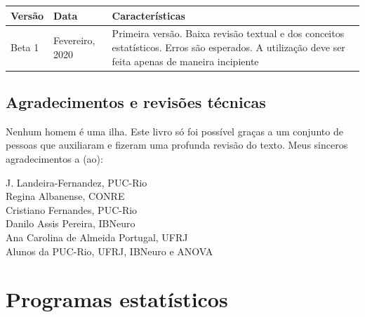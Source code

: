 \documentclass[
]{book}
\begin{document}
\begin{longtable}[]{@{}lll@{}}
\toprule
\begin{minipage}[b]{0.24\columnwidth}\raggedright
Versão\strut
\end{minipage} & \begin{minipage}[b]{0.34\columnwidth}\raggedright
Data\strut
\end{minipage} & \begin{minipage}[b]{0.34\columnwidth}\raggedright
Características\strut
\end{minipage}\tabularnewline
\midrule
\endhead
\begin{minipage}[t]{0.24\columnwidth}\raggedright
Beta 1\strut
\end{minipage} & \begin{minipage}[t]{0.34\columnwidth}\raggedright
Fevereiro, 2020\strut
\end{minipage} & \begin{minipage}[t]{0.34\columnwidth}\raggedright
Primeira versão. Baixa revisão textual e dos conceitos estatísticos. Erros são esperados. A utilização deve ser feita apenas de maneira incipiente\strut
\end{minipage}\tabularnewline
\bottomrule
\end{longtable}

\hypertarget{agradecimentos-e-revisuxf5es-tuxe9cnicas}{%
\section{Agradecimentos e revisões técnicas}\label{agradecimentos-e-revisuxf5es-tuxe9cnicas}}

Nenhum homem é uma ilha. Este livro só foi possível graças a um conjunto de pessoas que auxiliaram e fizeram uma profunda revisão do texto. Meus sinceros agradecimentos a (ao):

J. Landeira-Fernandez, PUC-Rio\\
Regina Albanense, CONRE\\
Cristiano Fernandes, PUC-Rio\\
Danilo Assis Pereira, IBNeuro\\
Ana Carolina de Almeida Portugal, UFRJ\\
Alunos da PUC-Rio, UFRJ, IBNeuro e ANOVA

\hypertarget{programas-estatuxedsticos}{%
\chapter{Programas estatísticos}\label{programas-estatuxedsticos}}
\end{document}
